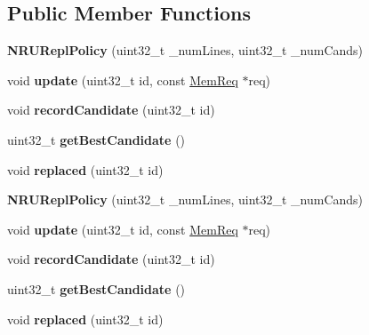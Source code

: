 \subsection*{Public Member Functions}
\begin{DoxyCompactItemize}
\item 
\hypertarget{classNRUReplPolicy_a27c7f78c587c0b735e64bb3cd54f1e49}{{\bfseries N\-R\-U\-Repl\-Policy} (uint32\-\_\-t \-\_\-num\-Lines, uint32\-\_\-t \-\_\-num\-Cands)}\label{classNRUReplPolicy_a27c7f78c587c0b735e64bb3cd54f1e49}

\item 
\hypertarget{classNRUReplPolicy_a7a4233813a7fe1d7ceb97ac252b89a6e}{void {\bfseries update} (uint32\-\_\-t id, const \hyperlink{structMemReq}{Mem\-Req} $\ast$req)}\label{classNRUReplPolicy_a7a4233813a7fe1d7ceb97ac252b89a6e}

\item 
\hypertarget{classNRUReplPolicy_ad7f8db759d58d04a9a00734bb2e328fd}{void {\bfseries record\-Candidate} (uint32\-\_\-t id)}\label{classNRUReplPolicy_ad7f8db759d58d04a9a00734bb2e328fd}

\item 
\hypertarget{classNRUReplPolicy_a663ecc98a9c6eeb907517ed522f72829}{uint32\-\_\-t {\bfseries get\-Best\-Candidate} ()}\label{classNRUReplPolicy_a663ecc98a9c6eeb907517ed522f72829}

\item 
\hypertarget{classNRUReplPolicy_a43a44c191266d3c26459c971a68ce715}{void {\bfseries replaced} (uint32\-\_\-t id)}\label{classNRUReplPolicy_a43a44c191266d3c26459c971a68ce715}

\item 
\hypertarget{classNRUReplPolicy_a27c7f78c587c0b735e64bb3cd54f1e49}{{\bfseries N\-R\-U\-Repl\-Policy} (uint32\-\_\-t \-\_\-num\-Lines, uint32\-\_\-t \-\_\-num\-Cands)}\label{classNRUReplPolicy_a27c7f78c587c0b735e64bb3cd54f1e49}

\item 
\hypertarget{classNRUReplPolicy_a7a4233813a7fe1d7ceb97ac252b89a6e}{void {\bfseries update} (uint32\-\_\-t id, const \hyperlink{structMemReq}{Mem\-Req} $\ast$req)}\label{classNRUReplPolicy_a7a4233813a7fe1d7ceb97ac252b89a6e}

\item 
\hypertarget{classNRUReplPolicy_ad7f8db759d58d04a9a00734bb2e328fd}{void {\bfseries record\-Candidate} (uint32\-\_\-t id)}\label{classNRUReplPolicy_ad7f8db759d58d04a9a00734bb2e328fd}

\item 
\hypertarget{classNRUReplPolicy_a663ecc98a9c6eeb907517ed522f72829}{uint32\-\_\-t {\bfseries get\-Best\-Candidate} ()}\label{classNRUReplPolicy_a663ecc98a9c6eeb907517ed522f72829}

\item 
\hypertarget{classNRUReplPolicy_a43a44c191266d3c26459c971a68ce715}{void {\bfseries replaced} (uint32\-\_\-t id)}\label{classNRUReplPolicy_a43a44c191266d3c26459c971a68ce715}

\end{DoxyCompactItemize}
